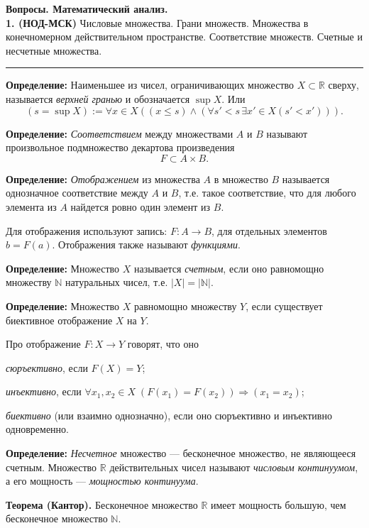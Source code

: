 \documentclass[12pt]{article}
\begin{document}
\textbf{Вопросы. Математический анализ.} \\



	\textbf{1. (НОД-МСК)} Числовые множества. Грани множеств. Множества в конечномерном действительном пространстве. Соответствие множеств. Счетные и несчетные множества.
	
	\noindent\rule{\textwidth}{1pt}
    
    
    \textbf{Определение:} Наименьшее из чисел, ограничивающих множество $X \subset \mathbb{R}$ сверху, называется \textit{верхней гранью} и обозначается $\sup X$. Или
    $$
    	(s = \sup X) := \forall x \in X ((x \leq s) \wedge (\forall s' < s \, \exists x' \in X (s' < x'))).
    $$
    
   \textbf{ Определение:} \textit{Соответствием} между множествами $A$ и $B$ называют произвольное подмножество декартова произведения 
   $$
   		F \subset A \times B. 
   $$
   
   \textbf{Определение:} \textit{Отображением} из множества $A$ в множество $B$ называется однозначное соответствие между $A$ и $B$, т.е. такое соответствие, что для любого элемента из $A$ найдется ровно один элемент из $B$.
   
   Для отображения используют запись: $F: A \rightarrow B$, для отдельных элементов $b = F(a)$. Отображения также называют \textit{функциями}.
   
  \textbf{Определение:} Множество $X$ называется \textit{счетным}, если оно равномощно множеству $\mathbb{N}$ натуральных чисел, т.е. $|X| = | \mathbb{N}|$. 
  
  \textbf{Определение:} Множество $X$ равномощно множеству $Y$, если существует биективное отображение $X$ на $Y$. 
  
  Про отображение $F: X \rightarrow Y$ говорят, что оно 
  
  \textit{сюръективно}, если $F(X) = Y$; 
  
  \textit{инъективно}, если $ \forall x_1, x_2 \in X \; (F(x_1) = F(x_2)) \Rightarrow (x_1 = x_2)$;
  
  \textit{биективно} (или взаимно однозначно), если оно сюръективно и инъективно одновременно.
  
  \textbf{Определение:} \textit{Несчетное} множество --- бесконечное множество, не являющееся счетным. Множество $\mathbb{R}$ действительных чисел называют \textit{числовым континуумом}, а его мощность --- \textit{мощностью континуума}. 
  
  \textbf{Теорема (Кантор).} Бесконечное множество $\mathbb{R}$ имеет мощность большую, чем бесконечное множество  $\mathbb{N}$. 
  
\end{document}
